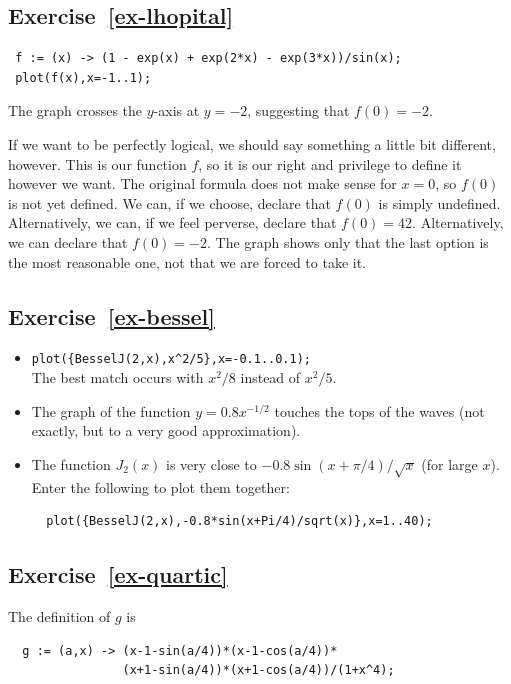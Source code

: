 \documentclass[a4paper,10pt]{amsbook}
\begin{document}
\subsection*{Exercise~\ref{ex-lhopital}}
\begin{verbatim}
 f := (x) -> (1 - exp(x) + exp(2*x) - exp(3*x))/sin(x);
 plot(f(x),x=-1..1);
\end{verbatim}
The graph crosses the $y$-axis at $y=-2$, suggesting that $f(0)=-2$. 

If we want to be perfectly logical, we should say something a little
bit different, however.  This is our function $f$, so it is our right
and privilege to define it however we want.  The original formula does
not make sense for $x=0$, so $f(0)$ is not yet defined.  We can, if we
choose, declare that $f(0)$ is simply undefined.  Alternatively, we
can, if we feel perverse, declare that $f(0)=42$.  Alternatively, we
can declare that $f(0)=-2$.  The graph shows only that the last option
is the most reasonable one, not that we are forced to take it. 

\subsection*{Exercise~\ref{ex-bessel}}
\begin{itemize}
 \item[(b)] \verb~plot({BesselJ(2,x),x^2/5},x=-0.1..0.1);~\\
  The best match occurs with $x^2/8$ instead of $x^2/5$. 
 \item[(d)] The graph of the function $y=0.8x^{-1/2}$ touches the tops
  of the waves (not exactly, but to a very good approximation). 
 \item[(f)] The function $J_2(x)$ is very close to
  $-0.8\sin(x+\pi/4)/\sqrt{x}$ (for large $x$).  Enter the following
  to plot them together:
\begin{verbatim}
  plot({BesselJ(2,x),-0.8*sin(x+Pi/4)/sqrt(x)},x=1..40);
\end{verbatim}
\end{itemize}

\subsection*{Exercise~\ref{ex-quartic}}
The definition of $g$ is
\begin{verbatim}
  g := (a,x) -> (x-1-sin(a/4))*(x-1-cos(a/4))*
                (x+1-sin(a/4))*(x+1-cos(a/4))/(1+x^4);
\end{verbatim}
\end{document}

